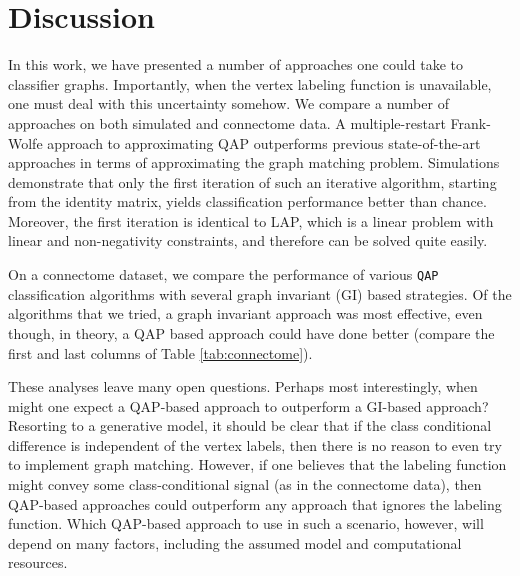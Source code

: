 \documentclass{article} %
\newcommand{\qap}{\texttt{QAP} }
\begin{document}
\section{Discussion}


In this work, we have presented a number of approaches one could take to classifier graphs.  Importantly, when the vertex labeling function is unavailable, one must deal with this uncertainty somehow.  We compare a number of approaches on both simulated and connectome data.  A multiple-restart Frank-Wolfe approach to approximating QAP outperforms previous state-of-the-art approaches in terms of approximating the graph matching problem.  Simulations demonstrate that only the first iteration of such an iterative algorithm, starting from the identity matrix, yields classification performance better than chance.  Moreover, the first iteration is identical to LAP, which is a linear problem with linear and non-negativity constraints, and therefore can be solved quite easily.  

On a connectome dataset, we compare the performance of various \qap classification algorithms with several graph invariant (GI) based strategies.  Of the algorithms that we tried, a graph invariant approach was most effective, even though, in theory, a QAP based approach could have done better (compare the first and last columns of Table \ref{tab:connectome}).  

These analyses leave many open questions.  Perhaps most interestingly, when might one expect a QAP-based approach to outperform a GI-based approach?  Resorting to a generative model, it should be clear that if the class conditional difference is independent of the vertex labels, then there is no reason to even try to implement graph matching.  However, if one believes that the labeling function might convey some class-conditional signal (as in the connectome data), then QAP-based approaches could outperform any approach that ignores the labeling function.  Which QAP-based approach to use in such a scenario, however, will depend on many factors, including the assumed model and computational resources.


% 




%
\end{document}
